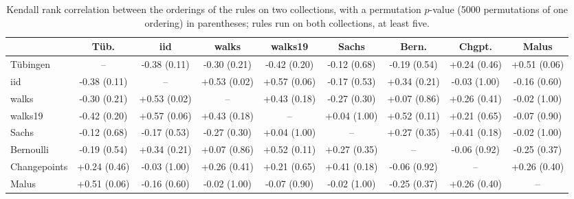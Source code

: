 \begin{table}[ht]
\caption{Kendall rank correlation between the orderings of the rules on two collections, with a permutation $p$-value (5000 permutations of one ordering) in parentheses; rules run on both collections, at least five.}
\label{tab:kendall}
\scriptsize\setlength{\tabcolsep}{2pt}
\begin{tabular}{@{}lcccccccc@{}}
\toprule
 & T\"ub. & iid & walks & walks19 & Sachs & Bern. & Chgpt. & Malus\\
\midrule
T\"ubingen & -- & -0.38 (0.11) & -0.30 (0.21) & -0.42 (0.20) & -0.12 (0.68) & -0.19 (0.54) & +0.24 (0.46) & +0.51 (0.06)\\
iid & -0.38 (0.11) & -- & +0.53 (0.02) & +0.57 (0.06) & -0.17 (0.53) & +0.34 (0.21) & -0.03 (1.00) & -0.16 (0.60)\\
walks & -0.30 (0.21) & +0.53 (0.02) & -- & +0.43 (0.18) & -0.27 (0.30) & +0.07 (0.86) & +0.26 (0.41) & -0.02 (1.00)\\
walks19 & -0.42 (0.20) & +0.57 (0.06) & +0.43 (0.18) & -- & +0.04 (1.00) & +0.52 (0.11) & +0.21 (0.65) & -0.07 (0.90)\\
Sachs & -0.12 (0.68) & -0.17 (0.53) & -0.27 (0.30) & +0.04 (1.00) & -- & +0.27 (0.35) & +0.41 (0.18) & -0.02 (1.00)\\
Bernoulli & -0.19 (0.54) & +0.34 (0.21) & +0.07 (0.86) & +0.52 (0.11) & +0.27 (0.35) & -- & -0.06 (0.92) & -0.25 (0.37)\\
Changepoints & +0.24 (0.46) & -0.03 (1.00) & +0.26 (0.41) & +0.21 (0.65) & +0.41 (0.18) & -0.06 (0.92) & -- & +0.26 (0.40)\\
Malus & +0.51 (0.06) & -0.16 (0.60) & -0.02 (1.00) & -0.07 (0.90) & -0.02 (1.00) & -0.25 (0.37) & +0.26 (0.40) & --\\
\bottomrule
\end{tabular}
\end{table}
